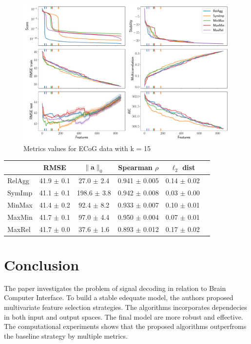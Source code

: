 \documentclass[12pt,twoside]{article}
\theoremstyle{definition}
\newcommand{\ba}{\mathbf{a}}
\begin{document}
\begin{figure}[h]
	\includegraphics[width=\linewidth]{figs/ecog_3_15_metrics.pdf}
	\caption{Metrics values for ECoG data with k = 15}
	\label{fig:ecog_3_15_metrics}
\end{figure}
\begin{table}[]
	\centering
	\begin{tabular}{l|ccccc}
		\hline
		& RMSE  & $\|\ba\|_0$ & Spearman $\rho$ & $\ell_2$ dist \\ \hline
		RelAgg & 41.9 $\pm$ 0.1 & 27.0 $\pm$ 2.4 & 0.941 $\pm$ 0.005 & 0.14 $\pm$ 0.02   \\
		SymImp & 41.1 $\pm$ 0.1 & 198.6 $\pm$ 3.8 & 0.942 $\pm$ 0.008 & 0.03 $\pm$ 0.00   \\
		MinMax & 41.4 $\pm$ 0.2 & 92.4 $\pm$ 8.2 & 0.933 $\pm$ 0.007 & 0.10 $\pm$ 0.01   \\
		MaxMin & 41.7 $\pm$ 0.1 & 97.0 $\pm$ 4.4 & 0.950 $\pm$ 0.004 & 0.07 $\pm$ 0.01   \\
		MaxRel & 41.7 $\pm$ 0.0 & 37.6 $\pm$ 1.6 & 0.893 $\pm$ 0.012 & 0.17 $\pm$ 0.02  \\ \hline
	\end{tabular}
\end{table}

\section{Conclusion}
The paper investigates the problem of signal decoding in relation to Brain Computer Interface. 
To build a stable edequate model, the authors proposed multivariate feature selection strategies. 
The algorithms incorporates dependecies in both input and output spaces. 
The final model are more robust and effective.
The computational experiments shows that the proposed algorithms outperfroms the baseline strategy by multiple metrics. 



\end{document}
